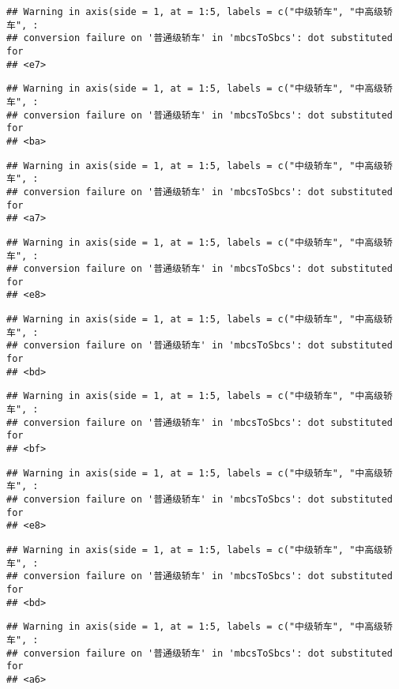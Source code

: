 \documentclass[]{article}
\begin{document}
\begin{verbatim}
## Warning in axis(side = 1, at = 1:5, labels = c("中级轿车", "中高级轿车", :
## conversion failure on '普通级轿车' in 'mbcsToSbcs': dot substituted for
## <e7>
\end{verbatim}

\begin{verbatim}
## Warning in axis(side = 1, at = 1:5, labels = c("中级轿车", "中高级轿车", :
## conversion failure on '普通级轿车' in 'mbcsToSbcs': dot substituted for
## <ba>
\end{verbatim}

\begin{verbatim}
## Warning in axis(side = 1, at = 1:5, labels = c("中级轿车", "中高级轿车", :
## conversion failure on '普通级轿车' in 'mbcsToSbcs': dot substituted for
## <a7>
\end{verbatim}

\begin{verbatim}
## Warning in axis(side = 1, at = 1:5, labels = c("中级轿车", "中高级轿车", :
## conversion failure on '普通级轿车' in 'mbcsToSbcs': dot substituted for
## <e8>
\end{verbatim}

\begin{verbatim}
## Warning in axis(side = 1, at = 1:5, labels = c("中级轿车", "中高级轿车", :
## conversion failure on '普通级轿车' in 'mbcsToSbcs': dot substituted for
## <bd>
\end{verbatim}

\begin{verbatim}
## Warning in axis(side = 1, at = 1:5, labels = c("中级轿车", "中高级轿车", :
## conversion failure on '普通级轿车' in 'mbcsToSbcs': dot substituted for
## <bf>
\end{verbatim}

\begin{verbatim}
## Warning in axis(side = 1, at = 1:5, labels = c("中级轿车", "中高级轿车", :
## conversion failure on '普通级轿车' in 'mbcsToSbcs': dot substituted for
## <e8>
\end{verbatim}

\begin{verbatim}
## Warning in axis(side = 1, at = 1:5, labels = c("中级轿车", "中高级轿车", :
## conversion failure on '普通级轿车' in 'mbcsToSbcs': dot substituted for
## <bd>
\end{verbatim}

\begin{verbatim}
## Warning in axis(side = 1, at = 1:5, labels = c("中级轿车", "中高级轿车", :
## conversion failure on '普通级轿车' in 'mbcsToSbcs': dot substituted for
## <a6>
\end{verbatim}
\end{document}
